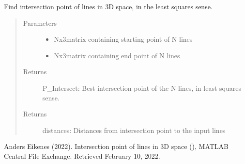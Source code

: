 \documentclass[letterpaper,10pt,english]{sphinxmanual}
\begin{document}
\label{\detokenize{ExperimentsPlannification:module-modules}}

\begin{fulllineitems}
\label{\detokenize{ExperimentsPlannification:modules.lineIntersect3D}}
\sphinxAtStartPar
Find intersection point of lines in 3D space, in the least squares sense.
\begin{quote}\begin{description}
\item[{Parameters}] \leavevmode\begin{itemize}
\item {} 
\sphinxAtStartPar
{} \textendash{} Nx3\sphinxhyphen{}matrix containing starting point of N lines

\item {} 
\sphinxAtStartPar
{} \textendash{} Nx3\sphinxhyphen{}matrix containing end point of N lines

\end{itemize}

\item[{Returns}] \leavevmode
\sphinxAtStartPar
P\_Intersect: Best intersection point of the N lines, in least squares sense.

\item[{Returns}] \leavevmode
\sphinxAtStartPar
distances: Distances from intersection point to the input lines

\end{description}\end{quote}

\sphinxAtStartPar
Anders Eikenes (2022). Intersection point of lines in 3D space
(), MATLAB Central File Exchange. Retrieved February 10, 2022.

\end{fulllineitems}

\label{\detokenize{ExperimentsPlannification:module-modules}}
\end{document}
